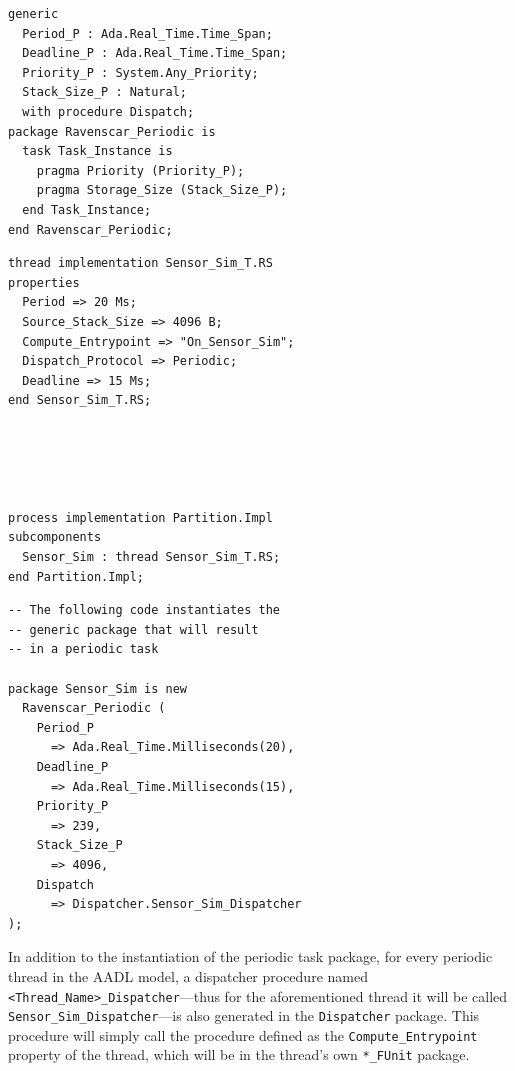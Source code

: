 \begin{minipage}{\listingwidth}
\flushleft
\lstset{language=ada}
\begin{lstlisting}[label=lst:ravenscar_periodic, caption=The
    \texttt{Ravenscar\_Periodic} generic package specification]
generic
  Period_P : Ada.Real_Time.Time_Span;
  Deadline_P : Ada.Real_Time.Time_Span;
  Priority_P : System.Any_Priority;
  Stack_Size_P : Natural;
  with procedure Dispatch;
package Ravenscar_Periodic is
  task Task_Instance is
    pragma Priority (Priority_P);
    pragma Storage_Size (Stack_Size_P);
  end Task_Instance;
end Ravenscar_Periodic;
\end{lstlisting}
\end{minipage}

\begin{minipage}{0.45\linewidth}
\lstset{language=aadl}
\begin{lstlisting}[label=lst:aadl_periodic, caption=AADL periodic thread]
thread implementation Sensor_Sim_T.RS
properties
  Period => 20 Ms;
  Source_Stack_Size => 4096 B;
  Compute_Entrypoint => "On_Sensor_Sim";
  Dispatch_Protocol => Periodic;
  Deadline => 15 Ms;
end Sensor_Sim_T.RS;





process implementation Partition.Impl
subcomponents
  Sensor_Sim : thread Sensor_Sim_T.RS;
end Partition.Impl;
\end{lstlisting}
\end{minipage}
\hspace{5mm}
\begin{minipage}{0.45\linewidth}
\lstset{language=ada}
\begin{lstlisting}[label=lst:ada_periodic, caption=Thread
    transformed to Ada task]
-- The following code instantiates the
-- generic package that will result
-- in a periodic task

package Sensor_Sim is new 
  Ravenscar_Periodic (
    Period_P
      => Ada.Real_Time.Milliseconds(20),
    Deadline_P
      => Ada.Real_Time.Milliseconds(15),
    Priority_P
      => 239,  
    Stack_Size_P
      => 4096, 
    Dispatch
      => Dispatcher.Sensor_Sim_Dispatcher
);
\end{lstlisting}
\end{minipage}

In addition to the instantiation of the periodic task package, for
every periodic thread in the AADL model, a dispatcher procedure named
\texttt{<Thread\_Name>\_Dispatcher}---thus for the aforementioned
thread it will be called \texttt{Sensor\_Sim\_Dispatcher}---is also
generated in the \texttt{Dispatcher} package. This procedure will
simply call the procedure defined as the \texttt{Compute\_Entrypoint}
property of the thread, which will be in the thread's own
\texttt{*\_FUnit} package.

